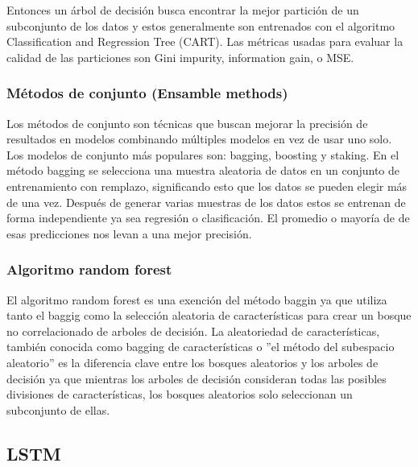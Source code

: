 Entonces un árbol de decisión busca encontrar la mejor partición de un subconjunto de los datos y estos generalmente son entrenados con el algoritmo Classification and Regression Tree (CART).
Las métricas usadas para evaluar la calidad de las particiones son Gini impurity, information gain, o MSE.   

\subsubsection{Métodos de conjunto (Ensamble methods)}

Los métodos de conjunto son técnicas que buscan mejorar la precisión de resultados en modelos combinando múltiples modelos en vez de usar uno solo. Los modelos de conjunto más populares son: bagging, boosting y staking.
En el método bagging se selecciona una muestra aleatoria de datos en un conjunto de entrenamiento con remplazo, significando esto que los datos se pueden elegir más de una vez. Después de generar varias muestras de los datos estos se entrenan de forma independiente ya sea regresión o clasificación. El promedio o mayoría de de esas predicciones nos levan a una mejor precisión.   

\subsubsection{Algoritmo random forest}

El algoritmo random forest es una exención del método baggin ya que utiliza tanto el baggig como la selección aleatoria de características para crear un bosque no correlacionado de arboles de decisión.
La aleatoriedad de características, también conocida como bagging de características o ''el método del subespacio aleatorio'' es la diferencia clave entre los bosques aleatorios y los arboles de decisión ya que mientras los arboles de decisión consideran todas las posibles divisiones de características, los bosques aleatorios solo seleccionan un subconjunto de ellas.


\subsection{LSTM}

